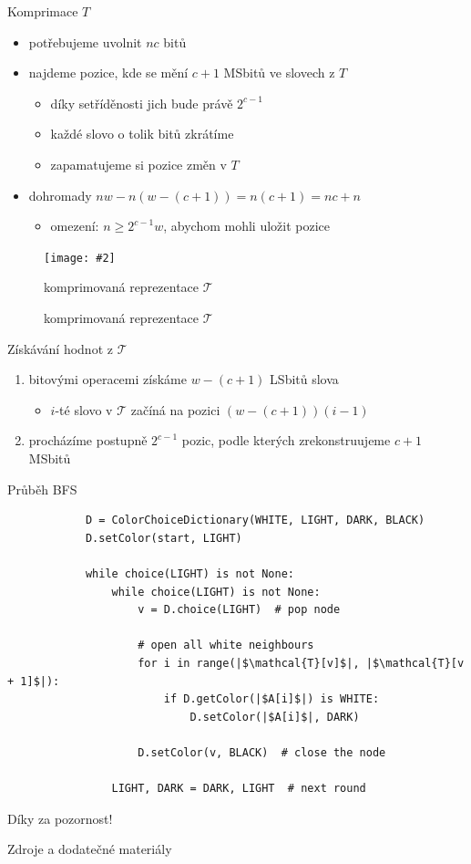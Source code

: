 \documentclass[czech]{beamer}
\makeatletter
\newcommand{\fitimage}[2][\@nil]{
	\begin{figure}
		\begin{adjustbox}{width=0.9\textwidth, totalheight=\textheight-2\baselineskip-2\baselineskip,keepaspectratio}
			\texttt{[image: \#2]}
		\end{adjustbox}
		\def\tmp{#1}%
	 \ifx\tmp\@nnil
			\else
			\caption{#1}
		\fi
	\end{figure}
}
\makeatother
\begin{document}
	\begin{frame}{Komprimace $T$}
		\begin{itemize}
			\item potřebujeme uvolnit $nc$ bitů
				\vfill
			\item najdeme pozice, kde se mění $c + 1$ MSbitů ve slovech z $T$
			\begin{itemize}
				\item díky setříděnosti jich bude právě $2^{c - 1}$
				\item každé slovo o tolik bitů zkrátíme
				\item zapamatujeme si pozice změn v $T$
			\end{itemize}
				\vfill
			\item dohromady $nw - n(w - (c + 1)) = n(c + 1) = nc + n$
			\begin{itemize}
				\item omezení: $n \ge 2^{c - 1}w$, abychom mohli uložit pozice
			\end{itemize}
		\end{itemize}

		\fitimage[komprimovaná reprezentace $\mathcal{T}$]{images/compression.png}
	\end{frame}

	\begin{frame}{Získávání hodnot z $\mathcal{T}$}
		\begin{enumerate}
			\item bitovými operacemi získáme $w - (c + 1)$ LSbitů slova
			\begin{itemize}
				\item $i$-té slovo v $\mathcal{T}$ začíná na pozici $(w - (c + 1))(i - 1)$
			\end{itemize}
			\item procházíme postupně $2^{c - 1}$ pozic, podle kterých zrekonstruujeme $c + 1$ MSbitů
		\end{enumerate}
	\end{frame}


	\begin{frame}[fragile]{Průběh BFS}
		\small
		\begin{verbatim}
			D = ColorChoiceDictionary(WHITE, LIGHT, DARK, BLACK)
			D.setColor(start, LIGHT)

			while choice(LIGHT) is not None:
				while choice(LIGHT) is not None:
					v = D.choice(LIGHT)  # pop node

					# open all white neighbours
					for i in range(|$\mathcal{T}[v]$|, |$\mathcal{T}[v + 1]$|):
						if D.getColor(|$A[i]$|) is WHITE:
							D.setColor(|$A[i]$|, DARK)

					D.setColor(v, BLACK)  # close the node

				LIGHT, DARK = DARK, LIGHT  # next round
		\end{verbatim}
	\end{frame}

	\begin{frame}[focus]
		Díky za pozornost!
	\end{frame}
	
	\appendix
	\begin{frame}{Zdroje a dodatečné materiály}
		\nocite{*}
		
		
	\end{frame}
\end{document}
